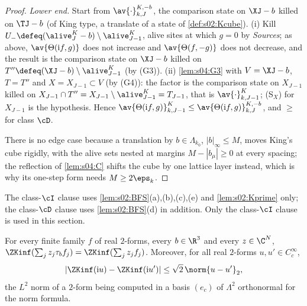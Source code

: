 \begin{proof}
\emph{Lower end.} Start from $\av{\cdot}^{K,-b}_{k,J}$, the comparison state on $\XJ-b$ killed on $\TJ-b$ (of King type, a translate of a state of \cref{def:s02:Kcube}). (i) Kill $U_-\defeq(\alive^K_J-b)\setminus\alive^K_{J-1}$, alive sites at which $g=0$ by \emph{Sources}; as above, $\av{\Theta(\mathrm if,g)}$ does not increase and $\av{\Theta(f,-g)}$ does not decrease, and the result is the comparison state on $\XJ-b$ killed on $T''\defeq(\XJ-b)\setminus\alive^K_{J-1}$ (by (G3)). (ii) \cref{lem:s04:G3} with $V=\XJ-b$, $T=T''$ and $X=X_{J-1}\subset V$ (by (G4)): the factor is the comparison state on $X_{J-1}$ killed on $X_{J-1}\cap T''=X_{J-1}\setminus\alive^K_{J-1}=T_{J-1}$, that is $\av{\cdot}^K_{k,J-1}$; (S$_X$) for $X_{J-1}$ is the hypothesis. Hence $\av{\Theta(\mathrm if,g)}^K_{k,J-1}\le\av{\Theta(\mathrm if,g)}^{K,-b}_{k,J}$, and $\ge$ for class $\cD$.

There is no edge case because a translation by $b\in\Lambda_{k_0}$, $|b|_\infty\le M$, moves King's cube rigidly, with the alive sets nested at margins $M-|b_\mu|\ge0$ at every spacing; the reflection of \cref{lem:s04:C} shifts the cube by one lattice layer instead, which is why its one-step form needs $M\ge2\eps_k$.
\end{proof}

The class-$\cI$ clause uses \cref{lem:s02:BFS}(a),(b),(c),(e) and \cref{lem:s02:Kprime} only; the class-$\cD$ clause uses \cref{lem:s02:BFS}(d) in addition. Only the class-$\cI$ clause is used in this section.

\begin{corollary}\label{cor:s06:TK}
For every finite family $f$ of real $2$-forms, every $b\in\R^3$ and every $z\in\C^N$, $\ZKinf(\sum_jz_j\tau_bf_j)=\ZKinf(\sum_jz_jf_j)$. Moreover, for all real $2$-forms $u,u'\in C^\infty_c$,
\[
|\ZKinf(\mathrm iu)-\ZKinf(\mathrm iu')|\le\sqrt2\,\norm{u-u'}_2,
\]
the $L^2$ norm of a $2$-form being computed in a basis $(e_c)$ of $\Lambda^2$ orthonormal for the norm formula.
\end{corollary}

